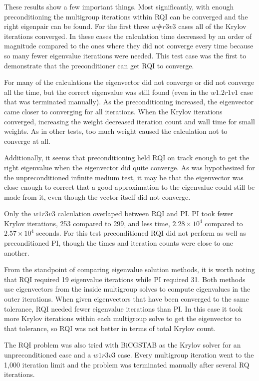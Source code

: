 These results show a few important things. Most significantly, with enough preconditioning the multigroup iterations within RQI can be converged and the right eigenpair can be found. For the first three $w\#r3v3$ cases all of the Krylov iterations converged. In these cases the calculation time decreased by an order of magnitude compared to the ones where they did not converge every time because so many fewer eigenvalue iterations were needed. This test case was the first to demonstrate that the preconditioner can get RQI to converge. 

For many of the calculations the eigenvector did not converge or did not converge all the time, but the correct eigenvalue was still found (even in the $w1.2r1v1$ case that was terminated manually). As the preconditioning increased, the eigenvector came closer to converging for all iterations. When the Krylov iterations converged, increasing the weight decreased iteration count and wall time for small weights. As in other tests, too much weight caused the calculation not to converge at all. 

Additionally, it seems that preconditioning held RQI on track enough to get the right eigenvalue when the eigenvector did quite converge. As was hypothesized for the unpreconditioned infinite medium test, it may be that the eigenvector was close enough to correct that a good approximation to the eigenvalue could still be made from it, even though the vector itself did not converge. 

Only the $w1r3v3$ calculation overlaped between RQI and PI. PI took fewer Krylov iterations, 253 compared to 299, and less time, $2.28 \times 10^{4}$ compared to $2.57 \times 10^{4}$ seconds. For this test preconditioned RQI did not perform as well as preconditioned PI, though the times and iteration counts were close to one another. 

From the standpoint of comparing eigenvalue solution methods, it is worth noting that RQI required 19 eigenvalue iterations while PI required 31. Both methods use eigenvectors from the inside multigroup solves to compute eigenvalues in the outer iterations. When given eigenvectors that have been converged to the same tolerance, RQI needed fewer eigenvalue iterations than PI. In this case it took more Krylov iterations within each multigroup solve to get the eigenvector to that tolerance, so RQI was not better in terms of total Krylov count.

The RQI problem was also tried with BiCGSTAB as the Krylov solver for an unpreconditioned case and a $w1r3v3$ case. Every multigroup iteration went to the 1,000 iteration limit and the problem was terminated manually after several RQ iterations.

